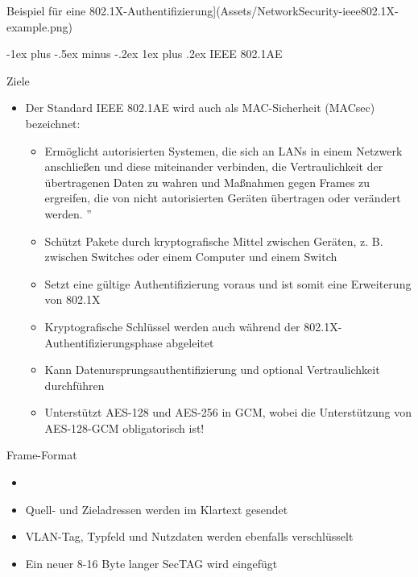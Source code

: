 \documentclass[a4paper]{article}
\makeatletter
\renewcommand{\subsubsection}{\@startsection{subsubsection}{3}{0mm}%
 {-1ex plus -.5ex minus -.2ex}%
 {1ex plus .2ex}%
 {\normalfont\small\bfseries}}
\makeatother
\begin{document}
\begin{multicols}{3}
    Beispiel für eine
    802.1X-Authentifizierung{]}(Assets/NetworkSecurity-ieee802.1X-example.png)


    \subsubsection{IEEE 802.1AE}

    Ziele

    \begin{itemize}
        \item
              Der Standard IEEE 802.1AE wird auch als MAC-Sicherheit (MACsec)
              bezeichnet:

              \begin{itemize}
                  \item
                        Ermöglicht autorisierten Systemen, die sich an LANs in einem
                        Netzwerk anschließen und diese miteinander verbinden, die
                        Vertraulichkeit der übertragenen Daten zu wahren und Maßnahmen gegen
                        Frames zu ergreifen, die von nicht autorisierten Geräten übertragen
                        oder verändert werden. ''
                  \item
                        Schützt Pakete durch kryptografische Mittel zwischen Geräten, z. B.
                        zwischen Switches oder einem Computer und einem Switch
                  \item
                        Setzt eine gültige Authentifizierung voraus und ist somit eine
                        Erweiterung von 802.1X
                  \item
                        Kryptografische Schlüssel werden auch während der
                        802.1X-Authentifizierungsphase abgeleitet
                  \item
                        Kann Datenursprungsauthentifizierung und optional Vertraulichkeit
                        durchführen
                  \item
                        Unterstützt AES-128 und AES-256 in GCM, wobei die Unterstützung von
                        AES-128-GCM obligatorisch ist!
              \end{itemize}
    \end{itemize}

    Frame-Format

    \begin{itemize}
        \item
        \item
              Quell- und Zieladressen werden im Klartext gesendet
        \item
              VLAN-Tag, Typfeld und Nutzdaten werden ebenfalls verschlüsselt
        \item
              Ein neuer 8-16 Byte langer SecTAG wird eingefügt


\end{itemize}
\end{multicols}
\end{document}
